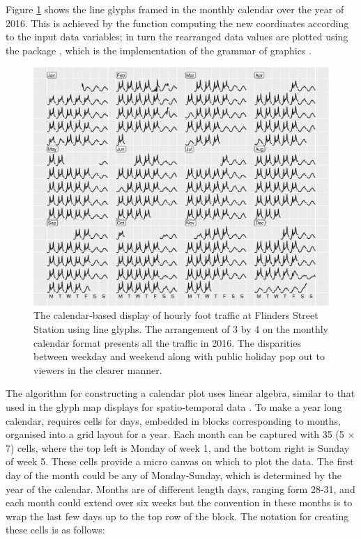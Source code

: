 \documentclass[article]{jss}
\begin{document}
Figure \ref{fig:flinders-2016} shows the line glyphs framed in the
monthly calendar over the year of 2016. This is achieved by the
 function computing the new coordinates according
to the input data variables; in turn the rearranged data values are
plotted using the  package \citep{R-ggplot2}, which is the
implementation of the grammar of graphics
\citep{wilkinson2006grammar, wickham2010layered}.

\begin{CodeChunk}
\begin{figure}

{\centering \includegraphics[width=\textwidth]{figure/flinders-2016-1} 

}

\caption[The calendar-based display of hourly foot traffic at Flinders Street Station using line glyphs]{The calendar-based display of hourly foot traffic at Flinders Street Station using line glyphs. The arrangement of 3 by 4 on the monthly calendar format presents all the traffic in 2016. The disparities between weekday and weekend along with public holiday pop out to viewers in the clearer manner.}\label{fig:flinders-2016}
\end{figure}
\end{CodeChunk}

The algorithm for constructing a calendar plot uses linear algebra,
similar to that used in the glyph map displays for spatio-temporal data
\citep{Wickham2012glyph}. To make a year long calendar, requires cells
for days, embedded in blocks corresponding to months, organised into a
grid layout for a year. Each month can be captured with 35 (5 \(\times\)
7) cells, where the top left is Monday of week 1, and the bottom right
is Sunday of week 5. These cells provide a micro canvas on which to plot
the data. The first day of the month could be any of Monday-Sunday,
which is determined by the year of the calendar. Months are of different
length days, ranging form 28-31, and each month could extend over six
weeks but the convention in these months is to wrap the last few days up
to the top row of the block. The notation for creating these cells is as
follows:
\end{document}

